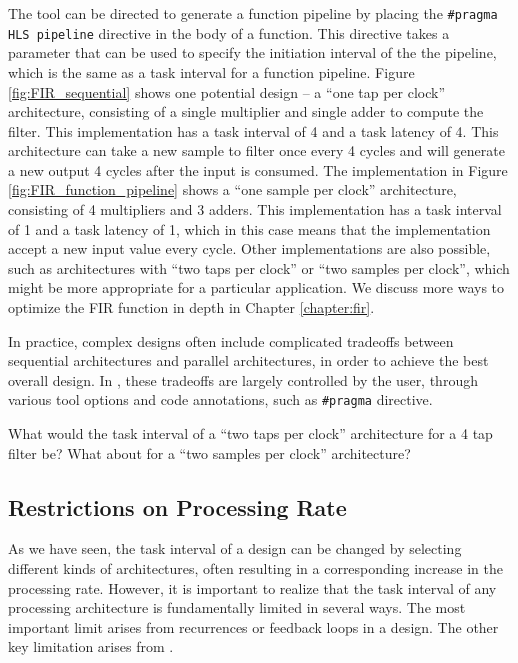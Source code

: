 The \VHLS tool can be directed to generate a function pipeline by placing the \lstinline|#pragma HLS pipeline| directive in the body of a function.  This directive takes a parameter that can be used to specify the initiation interval of the the pipeline, which is the same as a task interval for a function pipeline.  Figure \ref{fig:FIR_sequential} shows one potential design -- a ``one tap per clock'' architecture, consisting of a single multiplier and single adder to compute the filter.  This implementation has a task interval of 4 and a task latency of 4.  This architecture can take a new sample to filter once every 4 cycles and will generate a new output 4 cycles after the input is consumed. The implementation in Figure \ref{fig:FIR_function_pipeline} shows a ``one sample per clock'' architecture, consisting of 4 multipliers and 3 adders.  This implementation has a task interval of 1 and a task latency of 1, which in this case means that the implementation accept a new input value every cycle. Other implementations are also possible, such as architectures with ``two taps per clock'' or ``two samples per clock'', which might be more appropriate for a particular application.   We discuss more ways to optimize the FIR function in depth in Chapter \ref{chapter:fir}. 

In practice, complex designs often include complicated tradeoffs between sequential architectures and parallel architectures, in order to achieve the best overall design.  In \VHLS, these tradeoffs are largely controlled by the user, through various tool options and code annotations, such as \lstinline|#pragma| directive.

\begin{exercise}
What would the task interval of a ``two taps per clock'' architecture for a 4 tap filter be?  What about for a ``two samples per clock'' architecture?
\end{exercise}

\subsection{Restrictions on Processing Rate}

As we have seen, the task interval of a design can be changed by selecting different kinds of architectures, often resulting in a corresponding increase in the processing rate.  However, it is important to realize that the task interval of any processing architecture is fundamentally limited in several ways.  The most important limit arises from \glspl{recurrence} or feedback loops in a design.  The other key limitation arises from .

